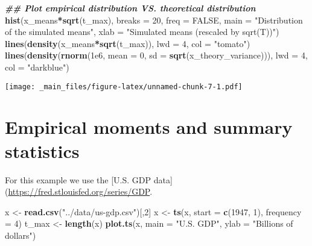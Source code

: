 \documentclass[
]{book}
\newenvironment{Shaded}{\begin{snugshade}}{\end{snugshade}}
\newcommand{\AttributeTok}[1]{\textcolor[rgb]{0.13,0.29,0.53}{#1}}
\newcommand{\ConstantTok}[1]{\textcolor[rgb]{0.56,0.35,0.01}{#1}}
\newcommand{\DecValTok}[1]{\textcolor[rgb]{0.00,0.00,0.81}{#1}}
\newcommand{\DocumentationTok}[1]{\textcolor[rgb]{0.56,0.35,0.01}{\textbf{\textit{#1}}}}
\newcommand{\FloatTok}[1]{\textcolor[rgb]{0.00,0.00,0.81}{#1}}
\newcommand{\FunctionTok}[1]{\textcolor[rgb]{0.13,0.29,0.53}{\textbf{#1}}}
\newcommand{\NormalTok}[1]{#1}
\newcommand{\OtherTok}[1]{\textcolor[rgb]{0.56,0.35,0.01}{#1}}
\newcommand{\SpecialCharTok}[1]{\textcolor[rgb]{0.81,0.36,0.00}{\textbf{#1}}}
\newcommand{\StringTok}[1]{\textcolor[rgb]{0.31,0.60,0.02}{#1}}
\begin{document}
\begin{Shaded}
\begin{Highlighting}[]
\DocumentationTok{\#\# Plot empirical distribution VS. theoretical distribution}
\FunctionTok{hist}\NormalTok{(x\_means}\SpecialCharTok{*}\FunctionTok{sqrt}\NormalTok{(t\_max), }\AttributeTok{breaks =} \DecValTok{20}\NormalTok{, }\AttributeTok{freq =} \ConstantTok{FALSE}\NormalTok{, }
     \AttributeTok{main =} \StringTok{"Distribution of the simulated means"}\NormalTok{, }
     \AttributeTok{xlab =} \StringTok{"Simulated means (rescaled by sqrt(T))"}\NormalTok{)}
\FunctionTok{lines}\NormalTok{(}\FunctionTok{density}\NormalTok{(x\_means}\SpecialCharTok{*}\FunctionTok{sqrt}\NormalTok{(t\_max)), }\AttributeTok{lwd =} \DecValTok{4}\NormalTok{, }\AttributeTok{col =} \StringTok{"tomato"}\NormalTok{)}
\FunctionTok{lines}\NormalTok{(}\FunctionTok{density}\NormalTok{(}\FunctionTok{rnorm}\NormalTok{(}\FloatTok{1e6}\NormalTok{, }\AttributeTok{mean =} \DecValTok{0}\NormalTok{, }\AttributeTok{sd =} \FunctionTok{sqrt}\NormalTok{(x\_theory\_variance))), }\AttributeTok{lwd =} \DecValTok{4}\NormalTok{, }\AttributeTok{col =} \StringTok{"darkblue"}\NormalTok{)}
\end{Highlighting}
\end{Shaded}

\texttt{[image: \_main\_files/figure-latex/unnamed-chunk-7-1.pdf]}

\hypertarget{empirical-moments-and-summary-statistics}{%
\section{Empirical moments and summary statistics}\label{empirical-moments-and-summary-statistics}}

For this example we use the {[}U.S. GDP data{]}(\url{https://fred.stlouisfed.org/series/GDP}.

\begin{Shaded}
\begin{Highlighting}[]
\NormalTok{x }\OtherTok{\textless{}{-}} \FunctionTok{read.csv}\NormalTok{(}\StringTok{"../data/us{-}gdp.csv"}\NormalTok{)[,}\DecValTok{2}\NormalTok{]}
\NormalTok{x }\OtherTok{\textless{}{-}} \FunctionTok{ts}\NormalTok{(x, }\AttributeTok{start =} \FunctionTok{c}\NormalTok{(}\DecValTok{1947}\NormalTok{, }\DecValTok{1}\NormalTok{), }\AttributeTok{frequency =} \DecValTok{4}\NormalTok{)}
\NormalTok{t\_max }\OtherTok{\textless{}{-}} \FunctionTok{length}\NormalTok{(x)}
\FunctionTok{plot.ts}\NormalTok{(x, }\AttributeTok{main =} \StringTok{"U.S. GDP"}\NormalTok{, }\AttributeTok{ylab =} \StringTok{"Billions of dollars"}\NormalTok{)}
\end{Highlighting}
\end{Shaded}
\end{document}
